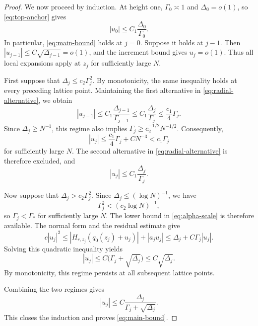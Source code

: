 \documentclass[11pt,reqno]{amsart}
\theoremstyle{definition}
\numberwithin{equation}{section}
\numberwithin{figure}{section}
\begin{document}
\begin{proof}
We now proceed by induction. At height one,
$\Gamma_0\asymp1$ and $\Delta_0=o(1)$, so
\eqref{eq:top-anchor} gives
\[
    |u_0|\leq C_1\frac{\Delta_0}{\Gamma_0}.
\]
In particular, \eqref{eq:main-bound} holds at $j=0$.
Suppose it holds at $j-1$. Then
$|u_{j-1}|\leq C\sqrt{\Delta_{j-1}}=o(1)$, and the increment
bound gives $u_j=o(1)$. Thus all local expansions apply at
$z_j$ for sufficiently large $N$.

First suppose that $\Delta_j\leq c_2\Gamma_j^2$.
By monotonicity, the same inequality holds at every preceding
lattice point. Maintaining the first alternative in
\eqref{eq:radial-alternative}, we obtain
\[
    |u_{j-1}|
    \leq C_1\frac{\Delta_{j-1}}{\Gamma_{j-1}}
    \leq C_1\frac{\Delta_j}{\Gamma_j}
    \leq \frac{c_1}{4}\Gamma_j.
\]
Since $\Delta_j\geq N^{-1}$, this regime also implies
$\Gamma_j\geq c_2^{-1/2}N^{-1/2}$.
Consequently,
\[
    |u_j|\leq \frac{c_1}{4}\Gamma_j+CN^{-3}
    <c_1\Gamma_j
\]
for sufficiently large $N$.
The second alternative in \eqref{eq:radial-alternative}
is therefore excluded, and
\[
    |u_j|\leq C_1\frac{\Delta_j}{\Gamma_j}.
\]

Now suppose that $\Delta_j>c_2\Gamma_j^2$.
Since $\Delta_j\leq(\log N)^{-1}$, we have
\[
    \Gamma_j^2<(c_2\log N)^{-1},
\]
so $\Gamma_j<\Gamma_*$ for sufficiently large $N$.
The lower bound in \eqref{eq:alpha-scale} is therefore
available. The normal form and the residual estimate give
\[
    c|u_j|^2
    \leq |H_{r,z_j}(q_0(z_j)+u_j)|+|a_ju_j|
    \leq \Delta_j+C\Gamma_j|u_j|.
\]
Solving this quadratic inequality yields
\[
    |u_j|\leq C\bigl(\Gamma_j+\sqrt{\Delta_j}\bigr)
    \leq C\sqrt{\Delta_j}.
\]
By monotonicity, this regime persists at all subsequent
lattice points.

Combining the two regimes gives
\[
    |u_j|
    \leq C\frac{\Delta_j}{\Gamma_j+\sqrt{\Delta_j}}.
\]
This closes the induction and proves \eqref{eq:main-bound}.
\end{proof}
\end{document}
